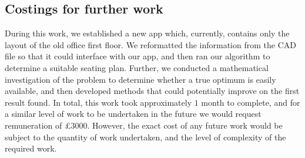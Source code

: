 \documentclass[11pt,a4paper]{article}
\begin{document}
\subsection*{Costings for further work}
During this work, we established a new app which, currently, contains only the layout of the old office first floor. We reformatted the information from the CAD file so that it could interface with our app, and then ran our algorithm to determine a suitable seating plan. Further, we conducted a mathematical investigation of the problem to determine whether a true optimum is easily available, and then developed methods that could potentially improve on the first result found. In total, this work took approximately $1$ month to complete, and for a similar level of work to be undertaken in the future we would request remuneration of £$3000$. However, the exact cost of any future work would be subject to the quantity of work undertaken, and the level of complexity of the required work.
\end{document}
